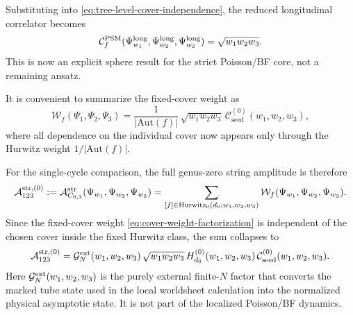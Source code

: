 \documentclass[11pt]{article}
\newcommand{\mc}[1]{\mathcal{#1}}
\begin{document}
Substituting into \eqref{eq:tree-level-cover-independence}, the reduced longitudinal correlator becomes
\begin{equation}\label{eq:psm-rigid-cover-reduction}
\mc C_f^{\rm PSM}(\Psi_{w_1}^{\rm long},\Psi_{w_2}^{\rm long},\Psi_{w_3}^{\rm long})
=
\sqrt{w_1w_2w_3}.
\end{equation}
This is now an explicit sphere result for the strict Poisson/BF core, not a remaining ansatz.

It is convenient to summarize the fixed-cover weight as
\begin{equation}\label{eq:cover-weight-factorization}
\mc W_f(\Psi_1,\Psi_2,\Psi_3)
=
\frac{1}{|\mathrm{Aut}(f)|}\,
\sqrt{w_1w_2w_3}\,
\mc C_{\mathrm{seed}}^{(0)}(w_1,w_2,w_3),
\end{equation}
where all dependence on the individual cover now appears only through the Hurwitz weight $1/|\mathrm{Aut}(f)|$.

For the single-cycle comparison, the full genus-zero string amplitude is therefore
\begin{equation}\label{eq:tree-level-string-three-point}
\mc A^{\rm str,(0)}_{123}
:=
\mc A^{\rm str}_{C_{0,3}}(\Psi_{w_1},\Psi_{w_2},\Psi_{w_3})
=
\sum_{[f]\in \mathrm{Hurwitz}_0(d_0;w_1,w_2,w_3)}
\mc W_f(\Psi_{w_1},\Psi_{w_2},\Psi_{w_3}).
\end{equation}
Since the fixed-cover weight \eqref{eq:cover-weight-factorization} is independent of the chosen cover inside the fixed Hurwitz class, the sum collapses to
\begin{equation}\label{eq:tree-level-hurwitz-reduction}
\mc A^{\rm str,(0)}_{123}
=
\mc G_N^{\rm ext}(w_1,w_2,w_3)\,
\sqrt{w_1w_2w_3}\,
H_{d_0}^{(0)}(w_1,w_2,w_3)\,
\mc C_{\mathrm{seed}}^{(0)}(w_1,w_2,w_3).
\end{equation}
Here $\mc G_N^{\rm ext}(w_1,w_2,w_3)$ is the purely external finite-$N$ factor that converts the marked tube state used in the local worldsheet calculation into the normalized physical asymptotic state. It is not part of the localized Poisson/BF dynamics.
\end{document}

